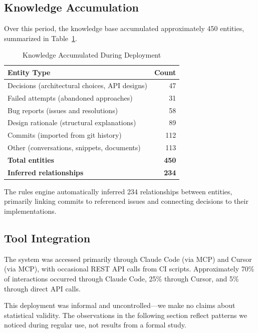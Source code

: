 \documentclass[10pt,journal,compsoc]{IEEEtran}
\begin{document}
\subsection{Knowledge Accumulation}

Over this period, the knowledge base accumulated approximately 450 entities, summarized in Table~\ref{tab:deployment}.

\begin{table}[t]
\caption{Knowledge Accumulated During Deployment}
\label{tab:deployment}
\centering
\small
\renewcommand{\arraystretch}{1.3}
\begin{tabular}{@{}p{} r@{}}
\toprule
\textbf{Entity Type} & \textbf{Count} \\
\midrule
Decisions (architectural choices, API designs) & 47 \\
Failed attempts (abandoned approaches) & 31 \\
Bug reports (issues and resolutions) & 58 \\
Design rationale (structural explanations) & 89 \\
Commits (imported from git history) & 112 \\
Other (conversations, snippets, documents) & 113 \\
\midrule
\textbf{Total entities} & \textbf{450} \\
\textbf{Inferred relationships} & \textbf{234} \\
\bottomrule
\end{tabular}
\end{table}

The rules engine automatically inferred 234 relationships between entities, primarily linking commits to referenced issues and connecting decisions to their implementations.

\subsection{Tool Integration}

The system was accessed primarily through Claude Code (via MCP) and Cursor (via MCP), with occasional REST API calls from CI scripts. Approximately 70\% of interactions occurred through Claude Code, 25\% through Cursor, and 5\% through direct API calls.

This deployment was informal and uncontrolled---we make no claims about statistical validity. The observations in the following section reflect patterns we noticed during regular use, not results from a formal study.
\end{document}
